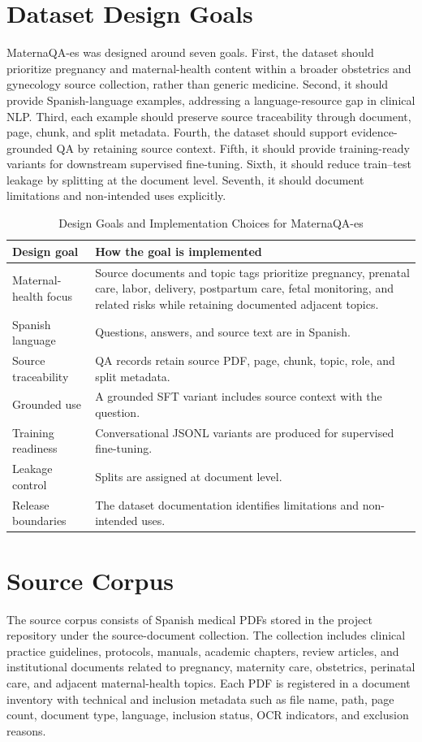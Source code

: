 \documentclass[conference]{IEEEtran}
\begin{document}
\section{Dataset Design Goals}
MaternaQA-es was designed around seven goals. First, the dataset should prioritize pregnancy and maternal-health content within a broader obstetrics and gynecology source collection, rather than generic medicine. Second, it should provide Spanish-language examples, addressing a language-resource gap in clinical NLP. Third, each example should preserve source traceability through document, page, chunk, and split metadata. Fourth, the dataset should support evidence-grounded QA by retaining source context. Fifth, it should provide training-ready variants for downstream supervised fine-tuning. Sixth, it should reduce train--test leakage by splitting at the document level. Seventh, it should document limitations and non-intended uses explicitly.

\begin{table}[t]
\caption{Design Goals and Implementation Choices for MaternaQA-es}
\label{tab:design_goals}
\centering
\begin{tabular}{|p{}|p{}|}
\hline
\textbf{Design goal} & \textbf{How the goal is implemented} \\
\hline
Maternal-health focus & Source documents and topic tags prioritize pregnancy, prenatal care, labor, delivery, postpartum care, fetal monitoring, and related risks while retaining documented adjacent topics. \\
\hline
Spanish language & Questions, answers, and source text are in Spanish. \\
\hline
Source traceability & QA records retain source PDF, page, chunk, topic, role, and split metadata. \\
\hline
Grounded use & A grounded SFT variant includes source context with the question. \\
\hline
Training readiness & Conversational JSONL variants are produced for supervised fine-tuning. \\
\hline
Leakage control & Splits are assigned at document level. \\
\hline
Release boundaries & The dataset documentation identifies limitations and non-intended uses. \\
\hline
\end{tabular}
\end{table}

\section{Source Corpus}
The source corpus consists of Spanish medical PDFs stored in the project repository under the source-document collection. The collection includes clinical practice guidelines, protocols, manuals, academic chapters, review articles, and institutional documents related to pregnancy, maternity care, obstetrics, perinatal care, and adjacent maternal-health topics. Each PDF is registered in a document inventory with technical and inclusion metadata such as file name, path, page count, document type, language, inclusion status, OCR indicators, and exclusion reasons.
\end{document}

